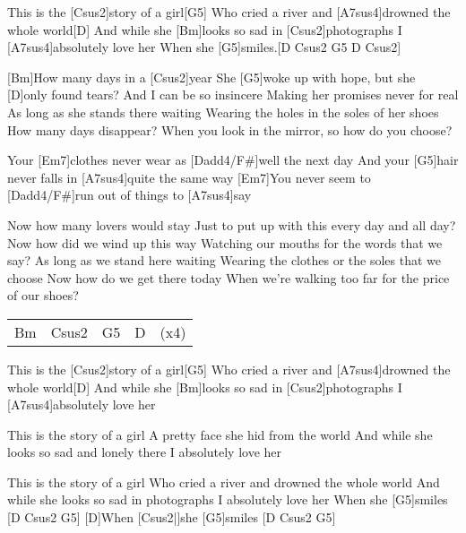 

\begin{guitar}
	This is the [Csus2]story of a girl[G5]{}
	Who cried a river and [A7sus4]drowned the whole world[D]{}
	And while she [Bm]looks so sad in [Csus2]photographs
	I [A7sus4]absolutely love her
	When she [G5]smiles.[D Csus2 G5 D Csus2]{}
	
	[Bm]How many days in a [Csus2]year
	She [G5]woke up with hope, but she [D]only found tears?
	And I can be so insincere
	Making her promises never for real
	As long as she stands there waiting
	Wearing the holes in the soles of her shoes
	How many days disappear?
	When you look in the mirror, so how do you choose?
	
	Your [Em7]clothes never wear as [Dadd4/F#]well the next day
	And your [G5]hair never falls in [A7sus4]quite the same way
	[Em7]You never seem to [Dadd4/F#]run out of things to [A7sus4]say
	
	 
	
	Now how many lovers would stay
	Just to put up with this every day and all day?
	Now how did we wind up this way
	Watching our mouths for the words that we say?
	As long as we stand here waiting
	Wearing the clothes or the soles that we choose
	Now how do we get there today
	When we're walking too far for the price of our shoes?
	
	\pagebreak
	 
	
	 
	
	{\footnotesize\begin{tabular}{l|l|l|l l}
			Bm & Csus2 & G5 & D & (x4)
	\end{tabular}}
	
	 
	
	This is the [Csus2]story of a girl[G5]{}
	Who cried a river and [A7sus4]drowned the whole world[D]{}
	And while she [Bm]looks so sad in [Csus2]photographs
	I [A7sus4]absolutely love her
		
	This is the story of a girl
	A pretty face she hid from the world
	And while she looks so sad and lonely there
	I absolutely love her
	
	This is the story of a girl
	Who cried a river and drowned the whole world
	And while she looks so sad in photographs
	I absolutely love her
	When she [G5]smiles [D Csus2 G5]{}
	[D]When [Csus2|]{she} [G5]smiles [D Csus2 G5]{}
\end{guitar}